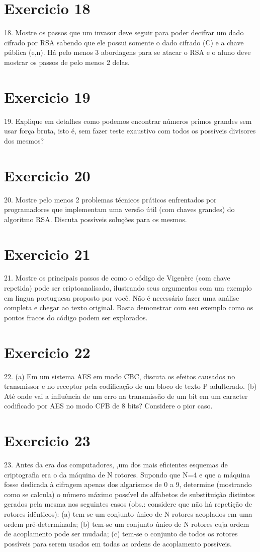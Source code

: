 \documentclass[10pt,a4paper]{report}
\begin{document}
\section{Exercicio 18}
18. Mostre os passos que um invasor deve seguir para poder decifrar um dado cifrado por RSA sabendo que ele possui somente o dado cifrado (C) e a chave pública (e,n). Há pelo menos 3 abordagens para se atacar o RSA e o aluno deve mostrar os passos de pelo menos 2 delas.
\section{Exercicio 19}
19. Explique em detalhes como podemos encontrar números primos grandes sem usar força bruta, isto é, sem fazer teste exaustivo com todos os possíveis divisores dos mesmos?
\section{Exercicio 20}
20. Mostre pelo menos 2 problemas técnicos práticos enfrentados por programadores que implementam uma versão útil (com chaves grandes) do algoritmo RSA. Discuta possíveis soluções para os mesmos.
\section{Exercicio 21}
21. Mostre os principais passos de como o código de Vigenère (com chave repetida) pode ser criptoanalisado, ilustrando seus argumentos com um exemplo em língua portuguesa proposto por você. Não é necessário fazer uma análise completa e chegar ao texto original. Basta demonstrar com seu exemplo como os pontos fracos do código podem ser explorados.
\section{Exercicio 22}
22. (a) Em um sistema AES em modo CBC, discuta os efeitos causados no transmissor e no receptor pela codificação de um bloco de texto P adulterado.
(b) Até onde vai a influência de um erro na transmissão de um bit em um caracter codificado por AES no modo CFB de 8 bits? Considere o pior caso.
\section{Exercicio 23}
23. Antes da era dos computadores, ,um dos mais eficientes esquemas de criptografia era o da máquina de N rotores. Supondo que N=4 e que a máquina fosse dedicada à cifragem apenas dos algarismos de 0 a 9, determine (mostrando como se calcula) o número máximo possível de alfabetos de substituição distintos gerados pela mesma nos seguintes casos (obs.: considere que não há repetição de rotores idênticos):
(a) tem-se um conjunto único de N rotores acoplados em uma ordem pré-determinada;
(b) tem-se um conjunto único de N rotores cuja ordem de acoplamento pode ser mudada;
(c) tem-se o conjunto de todos os rotores possíveis para serem usados em todas as ordens de acoplamento possíveis.
\end{document}
